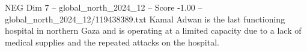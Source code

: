\begin{textsample}{NEG Dim 7 – global\_north\_2024\_12 – Score -1.00 – global\_north\_2024\_12/119438389.txt}
Kamal Adwan is the last functioning hospital in northern Gaza and is operating at a limited capacity due to a lack of medical supplies and the repeated attacks on the hospital.

\end{textsample}
